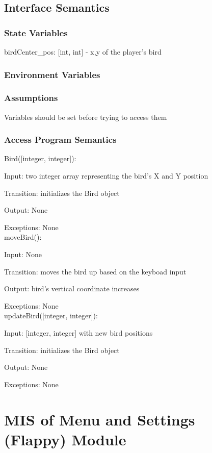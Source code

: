 \documentclass[12pt, titlepage]{article}
\begin{document}
		\subsection{Interface Semantics}
		\subsubsection{State Variables}
		birdCenter\_pos: [int, int] - x,y of the player's bird
		
		\subsubsection{Environment Variables}
		
		
		\subsubsection{Assumptions}
		Variables should be set before trying to access them \\ 
		
		
		\subsubsection{Access Program Semantics}
		
		
		Bird([integer, integer]):
		
		Input: two integer array representing the bird's X and Y position

		
		Transition: initializes the Bird object
		
		Output: None
		
		Exceptions: None \\
		
		moveBird():
		
		Input: None

		
		Transition: moves the bird up based on the keyboad input
		
		Output: bird's vertical coordinate increases
		
		Exceptions: None \\
		
		updateBird([integer, integer]):
		
		Input: [integer, integer] with new bird positions

		
		Transition: initializes the Bird object
		
		Output: None
		
		Exceptions: None \\
		
\section{MIS of Menu and Settings (Flappy) Module}
\end{document}
